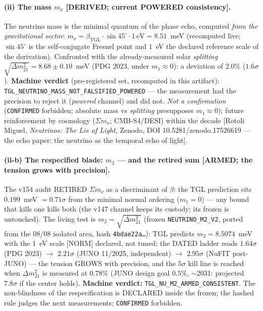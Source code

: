 \documentclass[11pt]{article}
\newcommand{\bTGL}{\beta_{\mathrm{TGL}}}\newcommand{\Msun}{M_{\odot}}\newcommand{\TGL}{\mathrm{TGL}}
\theoremstyle{definition}\newtheorem{deriv}{Derivation}
\begin{document}
\paragraph{(ii) The mass $m_\nu$ \textsf{[DERIVED; current POWERED consistency].}} The neutrino mass is the minimal quantum of the phase echo, computed \emph{from the gravitational sector}: $m_\nu=\bTGL\cdot\sin45^\circ\cdot1\,\text{eV}=8.51$~meV (recomputed live; $\sin45^\circ$ is the self-conjugate Fresnel point and $1$~eV the declared reference scale of the derivation). Confronted with the already-measured solar \emph{splitting} $\sqrt{\Delta m^2_{21}}=8.68\pm0.10$~meV (PDG 2023, under $m_1\!\approx\!0$): a deviation of $2.0\%$ ($1.6\sigma$). \textbf{Machine verdict} (pre-registered set, recomputed in this artifact): \texttt{TGL\_NEUTRINO\_MASS\_NOT\_FALSIFIED\_POWERED} --- the measurement had the precision to reject it (\emph{powered} channel) and did not. \emph{Not a confirmation} (\texttt{CONFIRMED} forbidden; absolute mass vs \emph{splitting} presupposes $m_1\!\approx\!0$); future reinforcement by cosmology ($\Sigma m_\nu$; CMB-S4/DESI) within the decade [Rotoli Miguel, \emph{Neutrinos: The Lie of Light}, Zenodo, DOI 10.5281/zenodo.17526619 --- the echo paper: the neutrino as the temporal echo of light].

\paragraph{(ii-b) The respecified blade: $m_2$ --- and the retired sum \textsf{[ARMED; the tension grows with precision].}} The v154 audit RETIRED $\Sigma m_\nu$ as a discriminant of $\beta$: the TGL prediction sits $0.199$~meV $=0.71\sigma$ from the minimal normal ordering ($m_1{=}0$) --- any bound that kills one kills both (the v147 channel keeps its custody; its frozen is untouched). The living test is $m_2=\sqrt{\Delta m^2_{21}}$ (frozen \texttt{NEUTRINO\_M2\_V2}, ported from the 08/08 isolated area, hash \texttt{4bdae22a\ldots}): TGL predicts $m_2=8.5074$~meV with the 1~eV scale [NORM] declared, not tuned; the DATED ladder reads $1.64\sigma$ (PDG 2023) $\to$ $2.21\sigma$ (JUNO 11/2025, independent) $\to$ $2.95\sigma$ (NuFIT post-JUNO) --- the tension GROWS with precision, and the $5\sigma$ kill line is reached when $\Delta m^2_{21}$ is measured at $0.78\%$ (JUNO design goal $0.5\%$, $\sim$2031: projected $7.8\sigma$ if the center holds). \textbf{Machine verdict:} \texttt{TGL\_NU\_M2\_ARMED\_CONSISTENT}. The non-blindness of the respecification is DECLARED inside the frozen; the hashed rule judges the next measurements; \texttt{CONFIRMED} forbidden.
\end{document}

